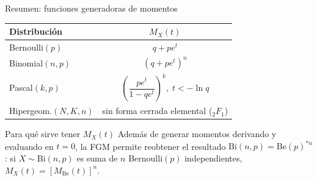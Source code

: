 \documentclass[aspectratio=169,11pt]{beamer}
\begin{document}
\begin{frame}{Resumen: funciones generadoras de momentos}
\begin{center}
\begin{tabular}{lc}
\toprule
\textbf{Distribución} & \textbf{$M_X(t)$} \\
\midrule
Bernoulli$(p)$ & $q+pe^t$ \\
Binomial$(n,p)$ & $(q+pe^t)^n$ \\
Pascal$(k,p)$ & $\left(\dfrac{pe^t}{1-qe^t}\right)^k, \; t<-\ln q$ \\
Hipergeom.$(N,K,n)$ & sin forma cerrada elemental (${}_2F_1$) \\
\bottomrule
\end{tabular}
\end{center}

\begin{alertblock}{Para qué sirve tener $M_X(t)$}
Además de generar momentos derivando y evaluando en $t=0$, la FGM permite reobtener el resultado $\text{Bi}(n,p) = \text{Be}(p)^{*n}$: si $X\sim\text{Bi}(n,p)$ es suma de $n$ Bernoulli$(p)$ independientes, $M_X(t)=[M_{\text{Be}}(t)]^n$.
\end{alertblock}
\end{frame}
\end{document}
